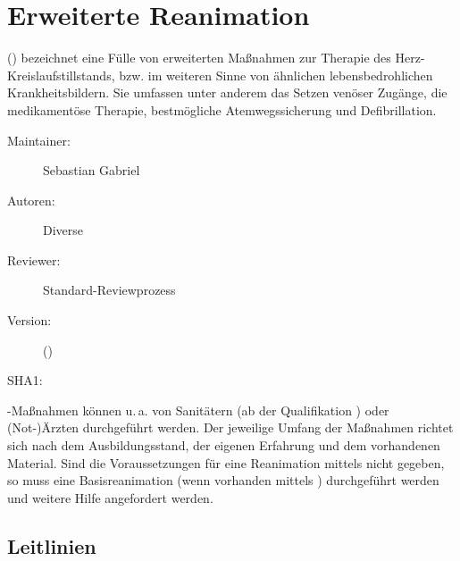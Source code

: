 % 
\def\ChapterCode{ALS}
\chapter
{Erweiterte Reanimation}
\label{chp:ALS}

\ChapterIntro
{%
 () bezeichnet eine Fülle
von erweiterten Maßnahmen zur Therapie des
Herz-Kreislaufstillstands, bzw. im weiteren Sinne von
ähnlichen lebensbedrohlichen Krankheitsbildern. Sie umfassen
unter anderem das Setzen venöser Zugänge, die medikamentöse
Therapie, bestmögliche Atemwegssicherung und Defibrillation.
}
{%
\begin{description}
  \item[Maintainer:] Sebastian Gabriel
  \item[Autoren:] Diverse
  \item[Reviewer:] Standard-Reviewprozess
  \item[Version:] {\DocVersion} ({\DocVersionInfo})
  \item[SHA1:] {\DocGitCommit}
\end{description}

{\TxTeilkapitelAASS}
}


\clearpage %
-Maßnahmen können 
u.\,a. von Sanitätern (ab der Qualifikation ) oder
(Not-)Ärzten durchgeführt werden. Der jeweilige Umfang der Maßnahmen
richtet sich nach dem Ausbildungsstand, der eigenen
Erfahrung und dem vorhandenen Material. Sind die
Voraussetzungen für eine Reanimation mittels 
nicht gegeben, so muss eine Basisreanimation (wenn
vorhanden mittels ) durchgeführt werden und weitere
Hilfe angefordert werden. 

\section{Leitlinien}


